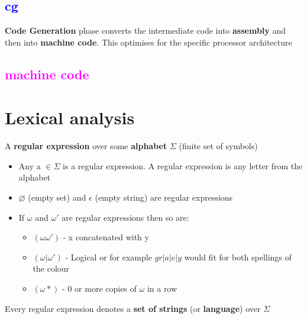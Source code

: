 \documentclass{article}[18pt]
\begin{document}
\subsection{\textcolor{blue}{cg}}
\textbf{Code Generation} phase converts the intermediate code into \textbf{assembly} and then into \textbf{machine code}. This optimises for the specific processor architecture
\subsection{\textcolor{magenta}{machine code}}
\newpage

\section{Lexical analysis}
A \textbf{regular expression} over some \textbf{alphabet} $\Sigma$ (finite set of symbols)
\begin{itemize}
\item Any a $\in \Sigma$ is a regular expression. A regular expression is any letter from the alphabet
\item $\varnothing$ (empty set) and $\epsilon$ (empty string) are regular expressions
\item If $\omega$ and $\omega'$ are regular expressions then so are:
\begin{itemize}
\item $(\omega\omega')$ - x concatenated with y
\item $(\omega|\omega')$ - Logical or for example $gr|a|e|y$ would fit for both spellings of the colour
\item $(\omega*)$ - 0 or more copies of $\omega$ in a row
\end{itemize}
\end{itemize}
Every regular expression denotes a \textbf{set of strings} (or \textbf{language}) over $\Sigma$
\end{document}
